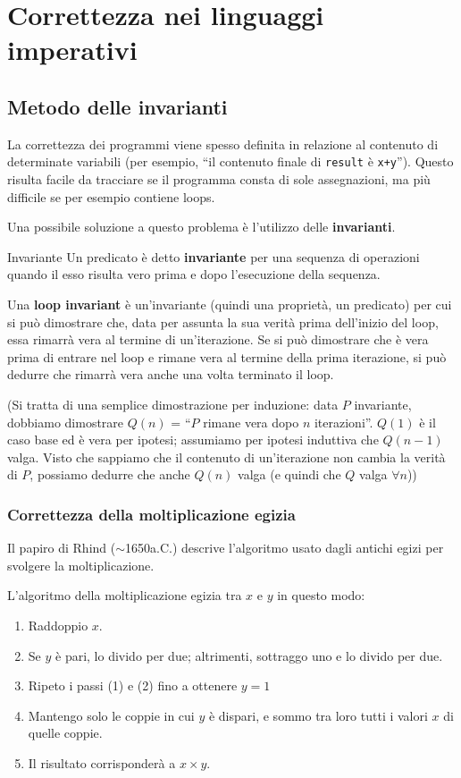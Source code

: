 \documentclass[a4paper,11pt]{report}
\begin{document}
\section{Correttezza nei linguaggi imperativi}

\subsection{Metodo delle invarianti}
La correttezza dei programmi viene spesso definita in relazione al contenuto di determinate variabili (per esempio, ``il contenuto finale di \texttt{result} è \texttt{x+y}''). Questo risulta facile da tracciare se il programma consta di sole assegnazioni, ma più difficile se per esempio contiene loops.

Una possibile soluzione a questo problema è l'utilizzo delle \textbf{invarianti}.
\begin{defframe}{Invariante}{}
    Un predicato è detto \textbf{invariante} per una sequenza di operazioni quando il esso risulta vero prima e dopo l'esecuzione della sequenza. 
\end{defframe}

Una \textbf{loop invariant} è un'invariante (quindi una proprietà, un predicato) per cui si può dimostrare che, data per assunta la sua verità prima dell'inizio del loop, essa rimarrà vera al termine di un'iterazione. Se si può dimostrare che è vera prima di entrare nel loop e rimane vera al termine della prima iterazione, si può dedurre che rimarrà vera anche una volta terminato il loop.

{\color{gray}\small (Si tratta di una semplice dimostrazione per induzione: data \( P \) invariante, dobbiamo dimostrare \( Q(n) \) = ``\( P \) rimane vera dopo \( n \) iterazioni''. \( Q(1) \) è il caso base ed è vera per ipotesi; assumiamo per ipotesi induttiva che \( Q(n-1) \) valga. Visto che sappiamo che il contenuto di un'iterazione non cambia la verità di \( P \), possiamo dedurre che anche \( Q(n) \) valga (e quindi che \( Q \) valga \( \forall n \)))}

\subsubsection{Correttezza della moltiplicazione egizia}
Il papiro di Rhind (\( \sim\)1650a.C.) descrive l'algoritmo usato dagli antichi egizi per svolgere la moltiplicazione. 

L'algoritmo della moltiplicazione egizia tra \( x \) e \( y \) in questo modo:
\begin{enumerate}
    \item Raddoppio \( x \).
    \item Se \( y \) è pari, lo divido per due; altrimenti, sottraggo uno e lo divido per due.
    \item Ripeto i passi (1) e (2) fino a ottenere \( y = 1 \)
    \item Mantengo solo le coppie in cui \( y \) è dispari, e sommo tra loro tutti i valori \( x \) di quelle coppie.
    \item Il risultato corrisponderà a \( x \times y \).
\end{enumerate}
\end{document}
